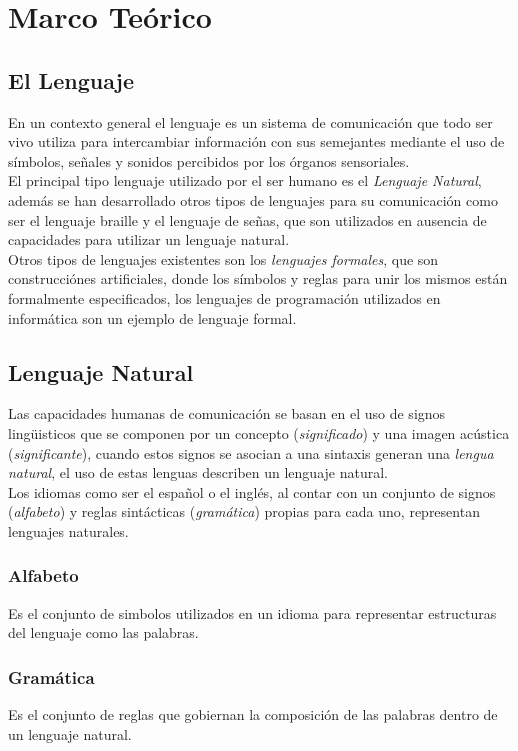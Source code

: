 \chapter{Marco Te\'orico}
\section{El Lenguaje}
En un contexto general el lenguaje es un sistema de comunicaci\'on que todo ser vivo 
utiliza para intercambiar informaci\'on con sus semejantes mediante el uso de
s\'imbolos, se\~nales y sonidos percibidos por los \'organos sensoriales. \\

El principal tipo lenguaje utilizado por el ser humano es el \emph{Lenguaje Natural}, 
adem\'as se han desarrollado otros tipos de lenguajes para su comunicaci\'on como ser 
el lenguaje braille y el lenguaje de se\~nas, que son utilizados en ausencia de 
capacidades para utilizar un lenguaje natural. \\

Otros tipos de lenguajes existentes son los \emph{lenguajes formales}, que
son construcci\'ones artificiales, donde los s\'imbolos y reglas para unir los mismos
est\'an formalmente especificados, los lenguajes de programaci\'on utilizados en 
inform\'atica son un ejemplo de lenguaje formal.


\section{Lenguaje Natural}
Las capacidades humanas de comunicaci\'on se basan en el uso de signos ling\"uisticos
que se componen por un concepto (\emph{significado}) y una imagen ac\'ustica
(\emph{significante}), cuando estos signos se asocian a una sintaxis generan  una
\emph{lengua natural}, el uso de estas lenguas describen un lenguaje natural. \\

Los idiomas como ser el espa\~nol o el ingl\'es, al contar con un conjunto de signos
(\emph{alfabeto}) y reglas sint\'acticas (\emph{gram\'atica}) propias para cada uno,
representan lenguajes naturales.

\subsection{Alfabeto}
Es el conjunto de simbolos utilizados en un idioma para representar estructuras del
lenguaje como las palabras.

\subsection{Gram\'atica}
Es el conjunto de reglas que gobiernan la composici\'on de las palabras dentro de un
lenguaje natural.


